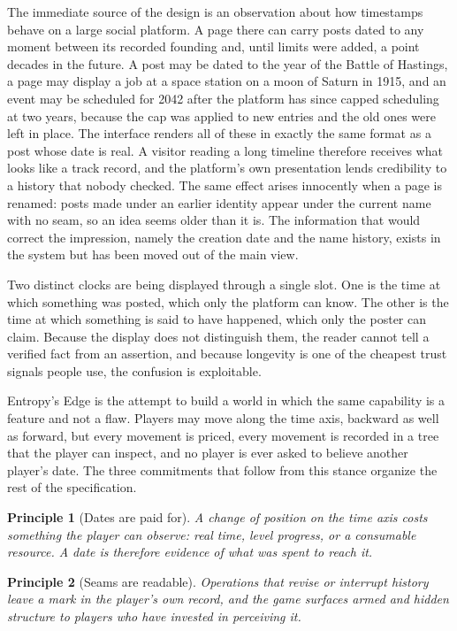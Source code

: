 \documentclass[11pt]{article}
\newtheorem{principle}{Principle}
\begin{document}
The immediate source of the design is an observation about how timestamps behave on a large social platform. A page there can carry posts dated to any moment between its recorded founding and, until limits were added, a point decades in the future. A post may be dated to the year of the Battle of Hastings, a page may display a job at a space station on a moon of Saturn in 1915, and an event may be scheduled for 2042 after the platform has since capped scheduling at two years, because the cap was applied to new entries and the old ones were left in place. The interface renders all of these in exactly the same format as a post whose date is real. A visitor reading a long timeline therefore receives what looks like a track record, and the platform's own presentation lends credibility to a history that nobody checked. The same effect arises innocently when a page is renamed: posts made under an earlier identity appear under the current name with no seam, so an idea seems older than it is. The information that would correct the impression, namely the creation date and the name history, exists in the system but has been moved out of the main view.

Two distinct clocks are being displayed through a single slot. One is the time at which something was posted, which only the platform can know. The other is the time at which something is said to have happened, which only the poster can claim. Because the display does not distinguish them, the reader cannot tell a verified fact from an assertion, and because longevity is one of the cheapest trust signals people use, the confusion is exploitable.

Entropy's Edge is the attempt to build a world in which the same capability is a feature and not a flaw. Players may move along the time axis, backward as well as forward, but every movement is priced, every movement is recorded in a tree that the player can inspect, and no player is ever asked to believe another player's date. The three commitments that follow from this stance organize the rest of the specification.

\begin{principle}[Dates are paid for]
A change of position on the time axis costs something the player can observe: real time, level progress, or a consumable resource. A date is therefore evidence of what was spent to reach it.
\end{principle}

\begin{principle}[Seams are readable]
Operations that revise or interrupt history leave a mark in the player's own record, and the game surfaces armed and hidden structure to players who have invested in perceiving it.
\end{principle}
\end{document}
